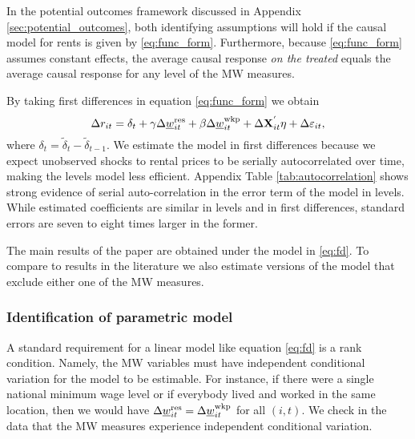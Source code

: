 In the potential outcomes framework discussed in Appendix 
\ref{sec:potential_outcomes}, both identifying assumptions will hold if
the causal model for rents is given by \eqref{eq:func_form}.
Furthermore, because \eqref{eq:func_form} assumes constant effects, the 
average causal response \textit{on the treated} equals the average causal 
response for any level of the MW measures.

By taking first differences in equation \eqref{eq:func_form} we obtain
\begin{equation}\label{eq:fd}
    \Delta r_{it} = \delta_t
                  + \gamma \Delta \underline{w}^{\text{res}}_{it} + \beta \Delta \underline{w}^{\text{wkp}}_{it}
                  + \Delta \mathbf{X}^{'}_{it}\eta
                  + \Delta \varepsilon_{it} ,
\end{equation}
where $\delta_t = \tilde{\delta}_t - \tilde{\delta}_{t-1}$.
We estimate the model in first differences because we expect unobserved shocks
to rental prices to be serially autocorrelated over time, making the levels
model less efficient.
Appendix Table \ref{tab:autocorrelation} shows strong evidence of serial 
auto-correlation in the error term of the model in levels.
While estimated coefficients are similar in levels and in first differences, 
standard errors are seven to eight times larger in the former.

The main results of the paper are obtained under the model in \eqref{eq:fd}. 
To compare to results in the literature we also estimate versions of the 
model that exclude either one of the MW measures.

\subsubsection*{Identification of parametric model}

A standard requirement for a linear model like equation \eqref{eq:fd} is a 
rank condition.
Namely, the MW variables must have independent conditional variation for the 
model to be estimable.
For instance, if there were a single national minimum wage level or if everybody 
lived and worked in the same location, then we would have
$\Delta \underline{w}^{\text{res}}_{it} = \Delta \underline{w}^{\text{wkp}}_{it}$ for all $(i,t)$.
We check in the data that the MW measures experience independent conditional 
variation.

